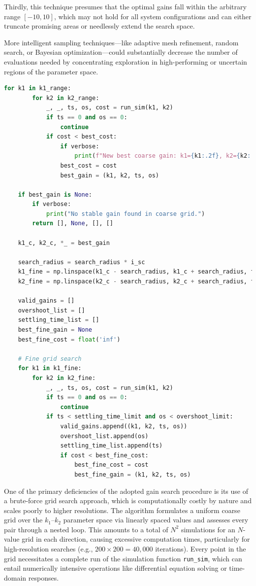 \documentclass{ifacconf}
\begin{document}
Thirdly, this technique presumes that the optimal gains fall within the arbitrary range $[-10, 10]$, which may not hold for all system configurations and can either truncate promising areas or needlessly extend the search space.

More intelligent sampling techniques—like adaptive mesh refinement, random search, or Bayesian optimization—could substantially decrease the number of evaluations needed by concentrating exploration in high-performing or uncertain regions of the parameter space.



\begin{lstlisting}[language=Python]
    for k1 in k1_range:
        for k2 in k2_range:
            _, _, ts, os, cost = run_sim(k1, k2)
            if ts == 0 and os == 0:
                continue
            if cost < best_cost:
                if verbose:
                    print(f"New best coarse gain: k1={k1:.2f}, k2={k2:.2f}, cost={cost:.2f}")
                best_cost = cost
                best_gain = (k1, k2, ts, os)

    if best_gain is None:
        if verbose:
            print("No stable gain found in coarse grid.")
        return [], None, [], []

    k1_c, k2_c, *_ = best_gain
   
    search_radius = search_radius * i_sc
    k1_fine = np.linspace(k1_c - search_radius, k1_c + search_radius, fine_resolution)
    k2_fine = np.linspace(k2_c - search_radius, k2_c + search_radius, fine_resolution)

    valid_gains = []
    overshoot_list = []
    settling_time_list = []
    best_fine_gain = None
    best_fine_cost = float('inf')

    # Fine grid search
    for k1 in k1_fine:
        for k2 in k2_fine:
            _, _, ts, os, cost = run_sim(k1, k2)
            if ts == 0 and os == 0:
                continue
            if ts < settling_time_limit and os < overshoot_limit:
                valid_gains.append((k1, k2, ts, os))
                overshoot_list.append(os)
                settling_time_list.append(ts)
                if cost < best_fine_cost:
                    best_fine_cost = cost
                    best_fine_gain = (k1, k2, ts, os)
\end{lstlisting}

One of the primary deficiencies of the adopted gain search procedure is its use of a brute-force grid search approach, which is computationally costly by nature and scales poorly to higher resolutions. The algorithm formulates a uniform coarse grid over the $k_1$–$k_2$ parameter space via linearly spaced values and assesses every pair through a nested loop. This amounts to a total of $N^2$ simulations for an $N$-value grid in each direction, causing excessive computation times, particularly for high-resolution searches (e.g., $200 \times 200 = 40{,}000$ iterations). Every point in the grid necessitates a complete run of the simulation function \texttt{run\_sim}, which can entail numerically intensive operations like differential equation solving or time-domain responses.
\end{document}
